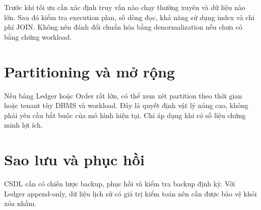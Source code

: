 Trước khi tối ưu cần xác định truy vấn nào chạy thường xuyên và dữ liệu nào lớn. Sau đó kiểm tra execution plan, số dòng đọc, khả năng sử dụng index và chi phí JOIN. Không nên đánh đổi chuẩn hóa bằng denormalization nếu chưa có bằng chứng workload.

\section{Partitioning và mở rộng}

Nếu bảng Ledger hoặc Order rất lớn, có thể xem xét partition theo thời gian hoặc tenant tùy DBMS và workload. Đây là quyết định vật lý nâng cao, không phải yêu cầu bắt buộc của mô hình hiện tại. Chỉ áp dụng khi có số liệu chứng minh lợi ích.

\section{Sao lưu và phục hồi}

CSDL cần có chiến lược backup, phục hồi và kiểm tra backup định kỳ. Với Ledger append-only, dữ liệu lịch sử có giá trị kiểm toán nên cần được bảo vệ khỏi xóa nhầm.
